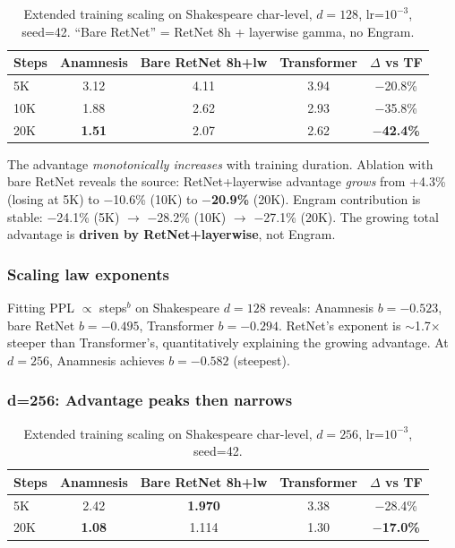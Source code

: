\documentclass[preprint,12pt]{elsarticle}
\begin{document}
\begin{table}[htbp]
\centering
\caption{Extended training scaling on Shakespeare char-level, $d=128$, lr=$10^{-3}$, seed=42. ``Bare RetNet'' = RetNet 8h + layerwise gamma, no Engram.}
\label{tab:scaling-extended}
\begin{tabular}{lcccc}
\toprule
Steps & Anamnesis & Bare RetNet 8h+lw & Transformer & $\Delta$ vs TF \\
\midrule
5K & 3.12 & 4.11 & 3.94 & $-$20.8\% \\
10K & 1.88 & 2.62 & 2.93 & $-$35.8\% \\
20K & \textbf{1.51} & 2.07 & 2.62 & \textbf{$-$42.4\%} \\
\bottomrule
\end{tabular}
\end{table}

The advantage \emph{monotonically increases} with training duration. Ablation with bare RetNet reveals the source: RetNet+layerwise advantage \emph{grows} from +4.3\% (losing at 5K) to $-$10.6\% (10K) to \textbf{$-$20.9\%} (20K). Engram contribution is stable: $-$24.1\% (5K) $\to$ $-$28.2\% (10K) $\to$ $-$27.1\% (20K). The growing total advantage is \textbf{driven by RetNet+layerwise}, not Engram.

\subsubsection{Scaling law exponents}

Fitting PPL $\propto$ steps$^b$ on Shakespeare $d=128$ reveals: Anamnesis $b{=}-0.523$, bare RetNet $b{=}-0.495$, Transformer $b{=}-0.294$. RetNet's exponent is $\sim$1.7$\times$ steeper than Transformer's, quantitatively explaining the growing advantage. At $d=256$, Anamnesis achieves $b{=}-0.582$ (steepest).

\subsubsection{d=256: Advantage peaks then narrows}

\begin{table}[htbp]
\centering
\caption{Extended training scaling on Shakespeare char-level, $d=256$, lr=$10^{-3}$, seed=42.}
\label{tab:scaling-d256}
\begin{tabular}{lcccc}
\toprule
Steps & Anamnesis & Bare RetNet 8h+lw & Transformer & $\Delta$ vs TF \\
\midrule
5K & 2.42 & \textbf{1.970} & 3.38 & $-$28.4\% \\
20K & \textbf{1.08} & 1.114 & 1.30 & \textbf{$-$17.0\%} \\
\bottomrule
\end{tabular}
\end{table}
\end{document}

